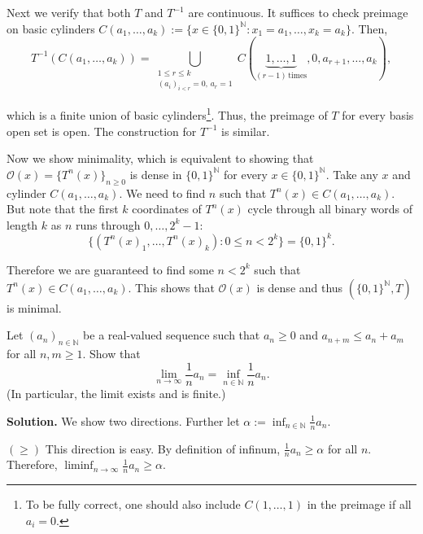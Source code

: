 \documentclass{template}
\begin{document}
Next we verify that both $T$ and $T^{-1}$ are continuous. It suffices to check
preimage on basic cylinders $C(a_1,\dots,a_k) := \{x \in \{0,1\}^{\mathbb{N}}:
x_1=a_1,\dots,x_k=a_k\}$. Then,
\begin{equation*}
    T^{-1}(C(a_1,\dots,a_k)) = \bigcup_{\substack{1 \leq r \leq k \\ (a_i)_{i<r}=0, \, a_r=1}} C(\underbrace{1,\dots,1}_{(r-1) \, \text{times}},0,a_{r+1},\dots,a_k),
\end{equation*}

which is a finite union of basic cylinders\footnote{To be fully correct, one should also include $C(1,\dots,1)$ in the preimage if all $a_i=0$.}. Thus, the preimage of $T$ for every basis open set is open.
The construction for $T^{-1}$ is similar.

Now we show minimality, which is equivalent to showing that
$\mathcal{O}(x)=\{T^n(x)\}_{n \geq 0}$ is dense in $\{0,1\}^{\mathbb{N}}$ for
every $x \in \{0,1\}^{\mathbb{N}}$. Take any $x$ and cylinder
$C(a_1,\dots,a_k)$. We need to find $n$ such that $T^n(x) \in C(a_1,\dots,a_k)$.
But note that the first $k$ coordinates of $T^n(x)$ cycle through all binary
words of length $k$ as $n$ runs through $0,\dots,2^k-1$: 
\begin{equation*}
    \{(T^n(x)_1, \dots, T^n(x)_k): 0 \leq n < 2^k\} = \{0,1\}^k.
\end{equation*}

Therefore we are guaranteed to find some $n<2^k$ such that $T^n(x) \in
C(a_1,\dots,a_k)$. This shows that $\mathcal{O}(x)$ is dense and thus
$(\{0,1\}^{\mathbb{N}}, T)$ is minimal.

\begin{problem}[Exercise 4]
    Let $(a_n)_{n \in \mathbb{N}}$ be a real-valued sequence such that $a_n \geq 0$
    and $a_{n+m} \leq a_n + a_m$ for all $n,m \geq 1$. Show that
    \begin{equation*}
        \lim_{n \to \infty} \frac{1}{n}a_n = \inf_{n \in \mathbb{N}} \frac{1}{n}a_n.
    \end{equation*}
    (In particular, the limit exists and is finite.)
\end{problem}

\textbf{Solution.} We show two directions. Further let $\alpha := \inf_{n \in \mathbb{N}} \frac{1}{n}a_n$.

$(\geq)$ This direction is easy. By definition of infinum, $\frac{1}{n}a_n \geq
\alpha$ for all $n$. Therefore, $\liminf_{n \to \infty} \frac{1}{n}a_n \geq \alpha$.
\end{document}
